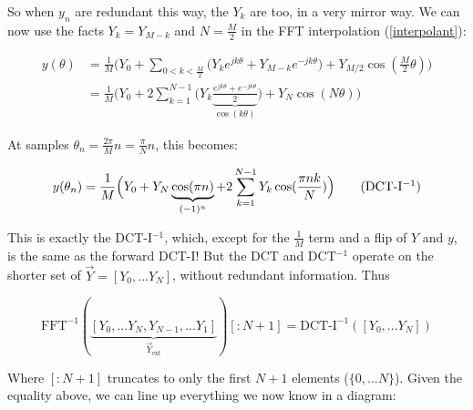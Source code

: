 \documentclass[10pt]{article}
\begin{document}
So when $y_n$ are redundant this way, the $Y_k$ are too, in a very mirror way. We can now use the facts $Y_k = Y_{M-k}$ and $N = \frac{M}{2}$ in the FFT interpolation (\autoref{interpolant}):

\begin{equation}\label{reconstruction}
\begin{aligned}
y(\theta) &= \frac{1}{M} \Big(Y_0 + \sum_{0 < k < \frac{M}{2}} \big( Y_k e^{j k \theta} + Y_{M-k} e^{-j k \theta}\big) + Y_{M/2}\cos(\frac{M}{2}\theta) \Big) \\
&= \frac{1}{M} \Big(Y_0 + 2 \sum_{k = 1}^{N-1} \big( Y_k \underbrace{\frac{e^{j k \theta} + e^{-j k \theta}}{2}}_{\cos(k\theta)} \big) + Y_N\cos(N \theta) \Big)
\end{aligned}
\end{equation}

At samples $\theta_n = \frac{2\pi}{M}n = \frac{\pi}{N}n$, this becomes:

\[
y(\theta_n) = \frac{1}{M} \Big(Y_0 + Y_N\underbrace{\cos(\pi n)}_{(-1)^n} + 2 \sum_{k = 1}^{N-1} Y_k \cos(\frac{\pi nk}{N}) \Big) \tag{DCT-I$^{-1}$}
\]

This is exactly the DCT-I$^{-1}$, which, except for the $\frac{1}{M}$ term and a flip of $Y$ and $y$, is the same as the forward DCT-I! But the DCT and DCT$^{-1}$ operate on the shorter set of $\vec{Y} = [Y_0, ... Y_N]$, without redundant information. Thus

\begin{equation}\label{ifftidct}
\text{FFT}^{-1}(\underbrace{[Y_0, ... Y_N, Y_{N-1}, ... Y_1]}_{\vec{Y}_{\text{ext}}})[:\!N+1] = \text{DCT-I}^{-1}([Y_0, ... Y_N])
\end{equation}

Where $[:\!N+1]$ truncates to only the first $N+1$ elements ($\{0, ... N\}$). Given the equality above, we can line up everything we now know in a diagram:
\end{document}
